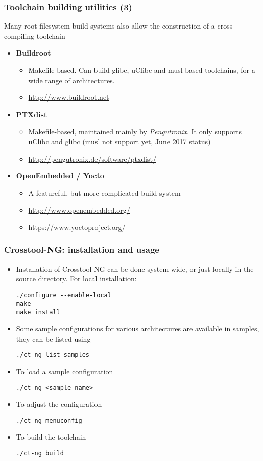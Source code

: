\begin{frame}
\frametitle{Toolchain building utilities (3)}
Many root filesystem build systems also allow the construction of
a cross-compiling toolchain
\begin{itemize}
\item {\bf Buildroot}
  \begin{itemize}
  \item Makefile-based. Can build glibc, uClibc and musl based
    toolchains, for a wide range of architectures.
  \item \url{http://www.buildroot.net}
  \end{itemize}
\item {\bf PTXdist}
  \begin{itemize}
  \item Makefile-based, maintained mainly by {\em Pengutronix}. It only
        supports uClibc and glibc (musl not support yet, June 2017 status)
  \item \url{http://pengutronix.de/software/ptxdist/}
  \end{itemize}
\item {\bf OpenEmbedded / Yocto}
  \begin{itemize}
  \item A featureful, but more complicated build system
  \item \url{http://www.openembedded.org/}
  \item \url{https://www.yoctoproject.org/}
  \end{itemize}
\end{itemize}
\end{frame}

\begin{frame}[fragile]
  \frametitle{Crosstool-NG: installation and usage}
  \begin{itemize}
  \item Installation of Crosstool-NG can be done system-wide, or just locally in
    the source directory. For local installation:
\begin{verbatim}
./configure --enable-local
make
make install
\end{verbatim}
  \item Some sample configurations for various architectures are
    available in
    samples, they can be listed using
\begin{verbatim}
./ct-ng list-samples
\end{verbatim}
  \item To load a sample configuration
\begin{verbatim}
./ct-ng <sample-name>
\end{verbatim}
  \item To adjust the configuration
\begin{verbatim}
./ct-ng menuconfig
\end{verbatim}
  \item To build the toolchain
\begin{verbatim}
./ct-ng build
\end{verbatim}
  \end{itemize}
\end{frame}

